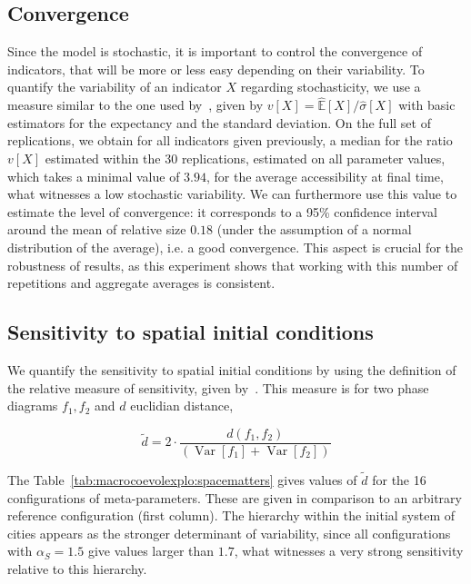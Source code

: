 \documentclass[graybox]{svmult}
\DeclareMathOperator{\Var}{Var}
\newcommand{\Varb}[1]{\ensuremath{\Var\!\left[#1\right]}}
\begin{document}
\subsection{Convergence}

Since the model is stochastic, it is important to control the convergence of indicators, that will be more or less easy depending on their variability. To quantify the variability of an indicator $X$ regarding stochasticity, we use a measure similar to the one used by~\cite{raimbault2018calibration}, given by $v\left[X\right] = \hat{\mathbb{E}}\left[X\right]/\hat{\sigma}\left[X\right]$ with basic estimators for the expectancy and the standard deviation. On the full set of replications, we obtain for all indicators given previously, a median for the ratio $v\left[X\right]$ estimated within the 30 replications, estimated on all parameter values, which takes a minimal value of $3.94$, for the average accessibility at final time, what witnesses a low stochastic variability. We can furthermore use this value to estimate the level of convergence: it corresponds to a 95\% confidence interval around the mean of relative size $0.18$ (under the assumption of a normal distribution of the average), i.e. a good convergence. This aspect is crucial for the robustness of results, as this experiment shows that working with this number of repetitions and aggregate averages is consistent.


\subsection{Sensitivity to spatial initial conditions}

We quantify the sensitivity to spatial initial conditions by using the definition of the relative measure of sensitivity, given by~\cite{cottineau2017initial}. This measure is for two phase diagrams $f_1,f_2$ and $d$ euclidian distance, 

\begin{equation}
\tilde{d} = 2 \cdot \frac{d(f_1,f_2)}{(\Varb{f_1}+\Varb{f_2})}
\end{equation}

The Table~\ref{tab:macrocoevolexplo:spacematters} gives values of $\tilde{d}$ for the 16 configurations of meta-parameters. These are given in comparison to an arbitrary reference configuration (first column). The hierarchy within the initial system of cities appears as the stronger determinant of variability, since all configurations with $\alpha_S = 1.5$ give values larger than $1.7$, what witnesses a very strong sensitivity relative to this hierarchy.
\end{document}
